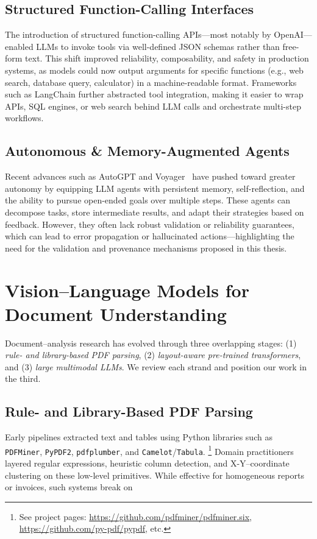 \subsection{Structured Function-Calling Interfaces}
The introduction of structured function-calling APIs—most notably by OpenAI—enabled LLMs to invoke tools via well-defined JSON schemas rather than free-form text. This shift improved reliability, composability, and safety in production systems, as models could now output arguments for specific functions (e.g., web search, database query, calculator) in a machine-readable format. Frameworks such as LangChain further abstracted tool integration, making it easier to wrap APIs, SQL engines, or web search behind LLM calls and orchestrate multi-step workflows.

\subsection{Autonomous \& Memory-Augmented Agents}
Recent advances such as AutoGPT and Voyager~\cite{wang2023voyager} have pushed toward greater autonomy by equipping LLM agents with persistent memory, self-reflection, and the ability to pursue open-ended goals over multiple steps. These agents can decompose tasks, store intermediate results, and adapt their strategies based on feedback. However, they often lack robust validation or reliability guarantees, which can lead to error propagation or hallucinated actions—highlighting the need for the validation and provenance mechanisms proposed in this thesis.

\section{Vision–Language Models for Document Understanding}
Document–analysis research has evolved through three overlapping stages:  
(1) \emph{rule- and library-based PDF parsing},  
(2) \emph{layout-aware pre-trained transformers}, and  
(3) \emph{large multimodal LLMs}.  
We review each strand and position our work in the third.

\subsection{Rule- and Library-Based PDF Parsing}
Early pipelines extracted text and tables using Python libraries such as
\texttt{PDFMiner}, \texttt{PyPDF2}, \texttt{pdfplumber}, and
\texttt{Camelot}/\texttt{Tabula}.%
\footnote{See project pages: \url{https://github.com/pdfminer/pdfminer.six},
\url{https://github.com/py-pdf/pypdf}, etc.}  
Domain practitioners layered regular expressions, heuristic column detection,
and X-Y–coordinate clustering on these low-level primitives.
While effective for homogeneous reports or invoices, such systems break on

